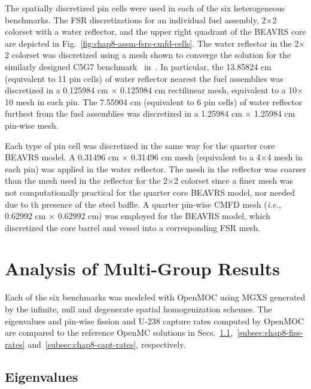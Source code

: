 The spatially discretized pin cells were used in each of the six heterogeneous benchmarks. The \ac{FSR} discretizations for an individual fuel assembly, 2$\times$2 colorset with a water reflector, and the upper right quadrant of the \ac{BEAVRS} core are depicted in Fig.~\ref{fig:chap8-assm-fsrs-cmfd-cells}. The water reflector in the 2$\times$2 colorset was discretized using a mesh shown to converge the solution for the similarly designed C5G7 benchmark~\cite{lewis2003c5g7} in~\cite{boyd2014ms}. In particular, the 13.85824 cm (equivalent to 11 pin cells) of water reflector nearest the fuel assemblies was discretized in a 0.125984 cm $\times$ 0.125984 cm rectilinear mesh, equivalent to a 10$\times$10 mesh in each pin. The 7.55904 cm (equivalent to 6 pin cells) of water reflector furthest from the fuel assemblies was discretized in a 1.25984 cm $\times$ 1.25984 cm pin-wise mesh.

Each type of pin cell was discretized in the same way for the quarter core \ac{BEAVRS} model. A 0.31496 cm $\times$ 0.31496 cm mesh (equivalent to a 4$\times$4 mesh in each pin) was applied in the water reflector. The mesh in the reflector was coarser than the mesh used in the reflector for the 2$\times$2 colorset since a finer mesh was not computationally practical for the quarter core \ac{BEAVRS} model, nor needed due to th presence of the steel baffle. A quarter pin-wise \ac{CMFD} mesh (\textit{i.e.}, 0.62992 cm $\times$ 0.62992 cm) was employed for the \ac{BEAVRS} model, which discretized the core barrel and vessel into a corresponding \ac{FSR} mesh.


\section{Analysis of Multi-Group Results}
\label{sec:chap8-mg-results}

Each of the six benchmarks was modeled with OpenMOC using \ac{MGXS} generated by the infinite, null and degenerate spatial homogenization schemes. The eigenvalues and pin-wise fission and U-238 capture rates computed by OpenMOC are compared to the reference OpenMC solutions in Secs.~\ref{subsec:chap8-eigenvalues},~\ref{subsec:chap8-fiss-rates} and~\ref{subsec:chap8-capt-rates}, respectively.

\subsection{Eigenvalues}
\label{subsec:chap8-eigenvalues}

